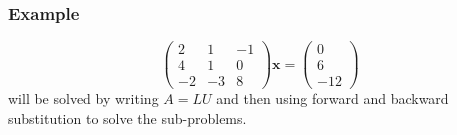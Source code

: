 \documentclass{beamer}
\newcommand{\bx}{{\boldsymbol{x}}}
\begin{document}
\begin{frame}
  \frametitle{Example}

  \begin{overlayarea}{\textwidth}{0.8\textheight}
    {
      \begin{equation*}
        \begin{pmatrix}
          2 & 1 & -1 \\
          4 & 1 & 0 \\
          -2 & -3 & 8
        \end{pmatrix}
        \bx =
        \begin{pmatrix}
          0 \\ 6 \\ -12
        \end{pmatrix}
      \end{equation*}
      will be solved by writing $A = L U$ and then using forward and
      backward substitution to solve the sub-problems.  

      \vspace{1ex}
    }
    {

}
\end{overlayarea}
\end{frame}
\end{document}
